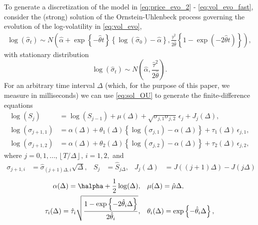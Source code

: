 To generate a discretization of the model in \eqref{eq:price_evo_2} - \eqref{eq:vol_evo_fast}, consider the (strong) solution of the Ornstein-Uhlenbeck process governing the evolution of the log-volatility in \eqref{eq:vol_evo},
\begin{align}\label{eq:sol_OU}
  \log(\hat{\sigma}_t) \sim N\left( \hat{\alpha} + \exp\left\{
      -\hat{\theta} t \right\} \left\{ \log(\hat{\sigma}_0) -
      \hat{\alpha} \right\}, \frac{\hat{\tau}^2}{2\hat{\theta}}\left\{
      1- \exp(-2\hat{\theta}t) \right\} \right)    ,
\end{align}
with stationary distribution
\begin{equation} \label{eq:stat-dist}
  \log(\hat{\sigma}_t) \sim N \left( \hat{\alpha} ,
    \frac{\hat{\tau}^2}{2\hat{\theta}} \right).
\end{equation}
For an arbitrary time interval $\Delta$ (which, for the purpose of this paper, we measure in milliseconds) we can use \eqref{eq:sol_OU} to generate the finite-difference equations
\begin{align}
  \log(S_{j}) &= \log(S_{j-1}) + \mu(\Delta) + \sqrt{\sigma_{j,1}\sigma_{j,2}} \, \epsilon_{j} + J_j(\Delta)   ,  \label{eq:price_evo_disc}  \\
  \log(\sigma_{j+1,1}) &= \alpha(\Delta) + \theta_1(\Delta) \left\{ \log(\sigma_{j,1}) - \alpha(\Delta) \right\} + \tau_1(\Delta) \, \epsilon_{j,1}    ,  \label{eq:vol_evo_slow_disc}  \\
  \log(\sigma_{j+1,2}) &= \alpha(\Delta) + \theta_2(\Delta) \left\{ \log(\sigma_{j,2}) - \alpha(\Delta) \right\} + \tau_2(\Delta) \, \epsilon_{j,2}    , \label{eq:vol_evo_fast_disc}
\end{align}
where $j = 0, 1, \ldots, \left\lfloor T/\Delta \right\rfloor, \, i = 1,2,$ and
\begin{align}
  \sigma_{j+1,i} &= \hat{\sigma}_{(j+1)\Delta,i}\sqrt{\Delta}, & S_j &= \hat{S}_{j\Delta}, & J_j(\Delta) &= J((j+1)\Delta) - J(j\Delta)
\end{align}
\begin{align}
  \label{eq:mu_sigma_tau}
  \begin{split}
    \alpha(\Delta) = \halpha + \frac{1}{2}\log(\Delta),\quad  & 
    \mu(\Delta) = \hat{\mu} \Delta,      \\
   \tau_i(\Delta) = \hat{\tau}_i \sqrt{ \frac{1 - \exp \left\{
          -2\hat{\theta}_i \Delta \right\}}{2\hat{\theta}_i } },\quad & \theta_i(\Delta) =
    \exp\left\{
      -\hat{\theta}_i \Delta \right\} ,
    \end{split}
\end{align}
